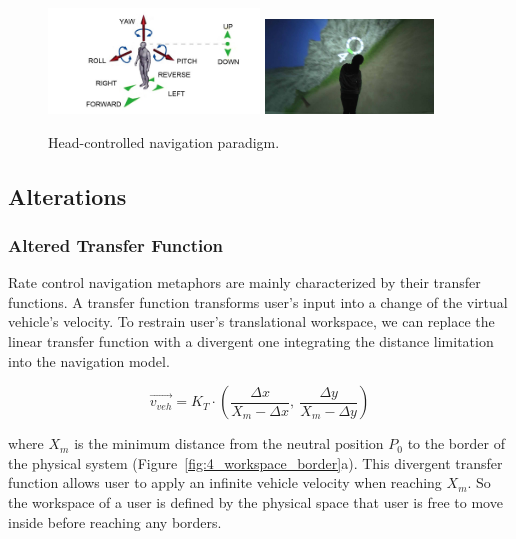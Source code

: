 \begin{figure}[tb]
  \centering
  \includegraphics[width=0.5\textwidth]{figures/ch4/HCNav}
  \includegraphics[width=0.4\textwidth]{figures/ch4/hcnav_roll}
  \caption{\label{fig:4_hcnav}Head-controlled navigation paradigm.}
\end{figure}

\subsection{Alterations}

\subsubsection{Altered Transfer Function}
\label{sec:altered_tf}
Rate control navigation metaphors are mainly characterized by their transfer functions. A transfer function transforms user's input into a change of the virtual vehicle's velocity. To restrain user's translational workspace, we can replace the linear transfer function with a divergent one integrating the distance limitation into the navigation model.

\begin{equation}
\overrightarrow{v_{veh}}=K_{T}\cdot \left(\frac{\Delta x}{X_{m}-\Delta x},\:\frac{\Delta y}{X_{m}-\Delta y}\right)
\end{equation}

where $X_{m}$ is the minimum distance from the neutral position $P_{0}$ to the border of the physical system (Figure~\ref{fig:4_workspace_border}a). This divergent transfer function allows user to apply an infinite vehicle velocity when reaching $X_{m}$. So the workspace of a user is defined by the physical space that user is free to move inside before reaching any borders.

